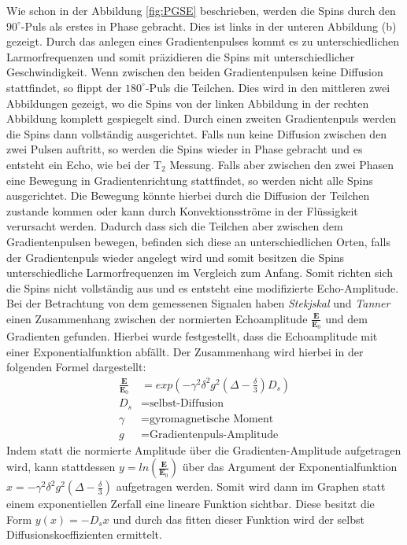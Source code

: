 Wie schon in der Abbildung \ref{fig:PGSE} beschrieben, werden die Spins durch den $90^{\circ}$-Puls als erstes in Phase gebracht. Dies ist links in der unteren Abbildung (b) gezeigt. Durch das anlegen eines Gradientenpulses kommt es zu unterschiedlichen Larmorfrequenzen und somit präzidieren die Spins mit unterschiedlicher Geschwindigkeit.
Wenn zwischen den beiden Gradientenpulsen keine Diffusion stattfindet, so flippt der $180^{\circ}$-Puls die Teilchen. Dies wird in den mittleren zwei Abbildungen gezeigt, wo die Spins von der linken Abbildung in der rechten Abbildung komplett gespiegelt sind. Durch einen zweiten Gradientenpuls werden die Spins dann vollständig ausgerichtet. Falls nun keine Diffusion zwischen den zwei Pulsen auftritt, so werden die Spins wieder in Phase gebracht und es entsteht ein Echo,
 wie bei der T$_2$ Messung.
Falls aber zwischen den zwei Phasen eine Bewegung in Gradientenrichtung stattfindet,
so werden nicht alle Spins ausgerichtet. 
Die Bewegung könnte hierbei durch die Diffusion der Teilchen zustande kommen oder kann durch Konvektionsströme in der Flüssigkeit verursacht werden.
Dadurch dass sich die Teilchen aber zwischen dem Gradientenpulsen bewegen, befinden sich diese an unterschiedlichen Orten, falls der Gradientenpuls wieder angelegt wird und somit besitzen die Spins unterschiedliche Larmorfrequenzen im Vergleich zum Anfang.
Somit richten sich die Spins nicht vollständig aus und es entsteht eine modifizierte Echo-Amplitude.
Bei der Betrachtung von dem gemessenen Signalen haben \textit{Stekjskal} und \textit{Tanner} einen Zusammenhang zwischen der normierten Echoamplitude $\frac{\textbf{E}}{\textbf{E}_0}$ und dem Gradienten gefunden. Hierbei wurde festgestellt, dass die Echoamplitude mit einer Exponentialfunktion abfällt. Der Zusammenhang wird hierbei in der folgenden Formel dargestellt:
\begin{align}
    \frac{\textbf{E}}{\textbf{E}_0}&=exp\left(-\gamma^2\delta^2g^2\left(\Delta-\frac{\delta}{3}\right)D_s\right)\\
    D_s&=\text{selbst-Diffusion}\\
    \gamma&= \text{gyromagnetische Moment}\\
    g &= \text{Gradientenpuls-Amplitude}
\end{align}
Indem statt die normierte Amplitude über die Gradienten-Amplitude aufgetragen wird, kann stattdessen $y=ln\left(\frac{\textbf{E}}{\textbf{E}_0}\right)$ über  das Argument der Exponentialfunktion\\
 $x= -\gamma^2\delta^2g^2\left(\Delta-\frac{\delta}{3}\right)$ aufgetragen werden. Somit wird dann im Graphen statt einem exponentiellen Zerfall eine lineare Funktion sichtbar. Diese besitzt die Form $y(x)=-D_sx$ und durch das fitten dieser Funktion wird der selbst Diffusionskoeffizienten ermittelt.       


